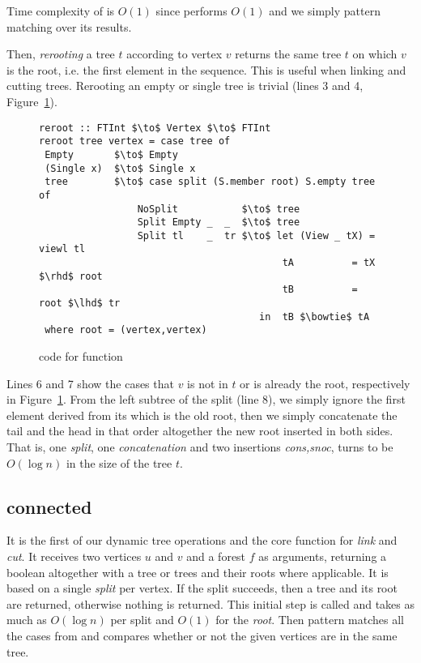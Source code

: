 Time complexity of  is $O(1)$ since  performs $O(1)$ and we simply pattern matching over its results.

Then, \textit{rerooting} a tree $t$ according to vertex $v$ returns the same tree $t$ on which $v$ is the root, i.e. the first element in the sequence. This is useful when linking and cutting trees. Rerooting an empty or single tree is trivial (lines 3 and 4, Figure~\ref{fig:reroot}). 
\begin{figure}
\begin{lstlisting}[mathescape]
reroot :: FTInt $\to$ Vertex $\to$ FTInt
reroot tree vertex = case tree of 
 Empty       $\to$ Empty 
 (Single x)  $\to$ Single x
 tree        $\to$ case split (S.member root) S.empty tree of 
                 NoSplit           $\to$ tree
                 Split Empty _  _  $\to$ tree 
                 Split tl    _  tr $\to$ let (View _ tX) = viewl tl 
                                          tA          = tX $\rhd$ root 
                                          tB          = root $\lhd$ tr 
                                      in  tB $\bowtie$ tA 
 where root = (vertex,vertex) 
\end{lstlisting} 
\caption{code for  function}
\label{fig:reroot}
\end{figure}
Lines 6 and 7 show the cases that $v$ is not in $t$ or is already the root, respectively in Figure~\ref{fig:reroot}. From the left subtree of the split (line 8), we simply ignore the first element derived from its  which is the old root, then we simply concatenate the tail and the head in that order altogether the new root inserted in both sides. That is, one \textit{split}, one \textit{concatenation} and two insertions \textit{cons,snoc}, turns to be $O(\log n)$ in the size of the tree $t$.  


\subsection{connected} 
It is the first of our dynamic tree operations and the core function for \textit{link} and \textit{cut}. It receives two vertices $u$ and $v$ and a forest $f$ as arguments, returning a boolean altogether with a tree or trees and their roots where applicable. It is based on a single \textit{split} per vertex. If the split succeeds, then a tree and its root are returned, otherwise nothing is returned. This initial step is called  and takes as much as $O(\log n)$ per split and $O(1)$ for the \textit{root}. Then  pattern matches all the cases from  and compares whether or not the given vertices are in the same tree. 

